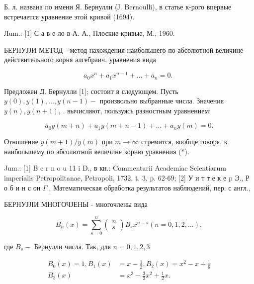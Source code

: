 \documentclass[10pt]{article}
\begin{document}
Б. л. названа по имени Я. Бернулли (Ј. Bernoulli), в статье к-рого впервые встречается уравнение этой кривой (1694).



Лum.: [1] С а в е ло в А. А., Плоские кривые, М., 1960.



БЕРНУЈЈИ МЕТОД - метод нахождения наибольшего по абсолютной величине действительного корня алгебраич. уравнения вида



\[

a_{0} x^{n}+a_{1} x^{n-1}+\ldots+a_{n}=0 \text {. }

\]



Предложен Д. Бернулли [1]; состоит в следующем. Пусть $y(0), y(1), \ldots, y(n-1)-$ произвольно выбранные числа. Значения $y(n), y(n+1)$, . вычисляют, пользуясь разностным уравнением:



\[

a_{0} y(m+n)+a_{1} y(m+n-1)+\ldots+a_{n} y(m)=0 .

\]



Отношение $y(m+1) / y(m)$ при $m \rightarrow \infty$ стремится, вообще говоря, к наибольшему по абсолютной величине корню уравнения (*).



Jum.: [1] B e r n o u 11 i D., в кн.: Commentarii Academiae Scientiarum imperialis Petropolitanae, Petropoli, 1732, t. 3, p. 62-69; [2] У и т т е к е p Э., Р о б и н с он $\Gamma .$, Математическая обработка результатов наблюдений, пер. с англ.,



БЕРНУЈЈІИ МНОГОЧЈЕНЫ - многочлены вида



\[

B_{n}(x)=\sum_{s=0}^{n}\left(\begin{array}{l}

n \\

s

\end{array}\right) B_{s} x^{n-s}(n=0,1,2, \ldots),

\]



где $B_{s}-$ Бернулли числа. Так, для $n=0,1,2,3$



\[

\begin{aligned}

B_{0}(x)=1, B_{1}(x) & =x-\frac{1}{2}, B_{2}(x)=x^{2}-x+\frac{1}{6} \\

B_{3}(x) & =x^{3}-\frac{3}{2} x^{2}+\frac{1}{2} x .

\end{aligned}

\]
\end{document}
